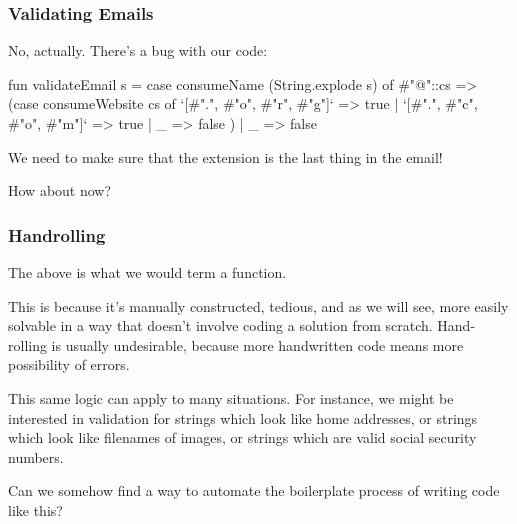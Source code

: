 \documentclass[aspectratio=169]{beamer}
\begin{document}
\begin{frame}[fragile]
  \frametitle{Validating Emails}

  No, actually. There's a bug with our code:

  \pause
  \begin{codeblock}
    fun validateEmail s =
      case consumeName (String.explode s) of
        #"@"::cs =>
          (case consumeWebsite cs of
            `[#".", #"o", #"r", #"g"]` => true
          | `[#".", #"c", #"o", #"m"]` => true
          | _ => false
          )
      | _ => false
  \end{codeblock}

  \pause
  \vspace{\fill}

  We need to make sure that the extension is the last thing in the
  email!

  \pause
  \vspace{\fill}

  How about now?
\end{frame}

\begin{frame}[fragile]
  \frametitle{Handrolling}

  The above is what we would term a  function.

  \pause
  \vspace{\fill}

  This is because it's manually constructed, tedious, and as we will
  see, more easily solvable in a way that doesn't involve coding a solution
  from scratch. Hand-rolling is usually undesirable, because more handwritten
  code means more possibility of errors.

  \pause
  \vspace{\fill}


  \pause
  \vspace{\fill}

  This same logic can apply to many situations. For instance, we might be
  interested in validation for strings which look like home addresses,
  or strings which look like filenames of images, or strings which are valid
  social security numbers.

  \pause
  \vspace{\fill}

  Can we somehow find a way to automate the boilerplate process of writing
  code like this?
\end{frame}
\end{document}
